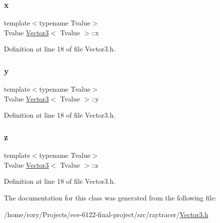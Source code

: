 \subsubsection{\texorpdfstring{x}{x}}
{\footnotesize\ttfamily template$<$typename Tvalue$>$ \\
Tvalue \hyperlink{class_vector3}{Vector3}$<$ Tvalue $>$\+::x}



Definition at line 18 of file Vector3.\+h.

\mbox{\label{class_vector3_a5742639cebe5b4750358cd08ee8835b6}} 
\subsubsection{\texorpdfstring{y}{y}}
{\footnotesize\ttfamily template$<$typename Tvalue$>$ \\
Tvalue \hyperlink{class_vector3}{Vector3}$<$ Tvalue $>$\+::y}



Definition at line 18 of file Vector3.\+h.

\mbox{\label{class_vector3_a6d9eb4a6396bd9bbb246657b624717ae}} 
\subsubsection{\texorpdfstring{z}{z}}
{\footnotesize\ttfamily template$<$typename Tvalue$>$ \\
Tvalue \hyperlink{class_vector3}{Vector3}$<$ Tvalue $>$\+::z}



Definition at line 18 of file Vector3.\+h.



The documentation for this class was generated from the following file\+:\begin{DoxyCompactItemize}
\item 
/home/rory/\+Projects/ece-\/6122-\/final-\/project/src/raytracer/\hyperlink{_vector3_8h}{Vector3.\+h}\end{DoxyCompactItemize}
